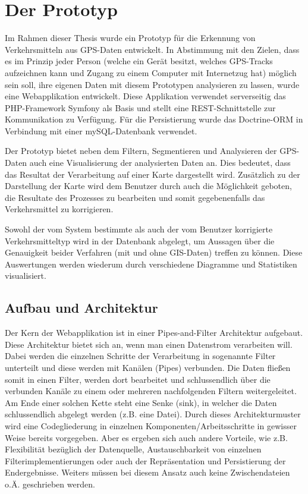 \chapter{Der Prototyp}

Im Rahmen dieser Thesis  wurde ein Prototyp für die Erkennung von Verkehrsmitteln aus GPS-Daten entwickelt. In Abstimmung mit den Zielen, dass es im Prinzip jeder Person (welche ein Gerät besitzt, welches GPS-Tracks aufzeichnen kann und Zugang zu einem Computer mit Internetzug hat) möglich sein soll, ihre eigenen Daten mit diesem Prototypen analysieren zu lassen, wurde eine Webapplikation entwickelt. Diese Applikation verwendet serverseitig das PHP-Framework Symfony als Basis und stellt eine REST-Schnittstelle zur Kommunikation zu Verfügung. Für die Persistierung wurde das Doctrine-ORM in Verbindung mit einer mySQL-Datenbank verwendet.

Der Prototyp bietet neben dem Filtern, Segmentieren und Analysieren der GPS-Daten auch eine Visualisierung der analysierten Daten an. Dies bedeutet, dass das Resultat der Verarbeitung auf einer Karte dargestellt wird. Zusätzlich zu der Darstellung der Karte wird dem Benutzer durch auch die Möglichkeit geboten, die Resultate des Prozesses zu bearbeiten und somit gegebenenfalls das Verkehrsmittel zu korrigieren. 

Sowohl der vom System bestimmte als auch der vom Benutzer  korrigierte Verkehrsmitteltyp wird in der Datenbank abgelegt, um Aussagen über die Genauigkeit beider Verfahren (mit und ohne GIS-Daten) treffen zu können. Diese Auswertungen werden wiederum durch verschiedene Diagramme und Statistiken visualisiert.
\clearpage

\section{Aufbau und Architektur}
Der Kern der Webapplikation ist in einer Pipes-and-Filter Architektur aufgebaut. Diese Architektur bietet sich an, wenn man einen Datenstrom verarbeiten will. Dabei werden die einzelnen Schritte der Verarbeitung in sogenannte Filter unterteilt und diese werden mit Kanälen (Pipes) verbunden. Die Daten fließen somit in einen Filter, werden dort bearbeitet und schlussendlich über die verbunden Kanäle zu einem oder mehreren nachfolgenden Filtern weitergeleitet. Am Ende einer solchen Kette steht eine Senke (sink), in welcher die Daten schlussendlich abgelegt werden (z.B. eine Datei). Durch dieses Architekturmuster wird eine Codegliederung in einzelnen Komponenten/Arbeitsschritte in gewisser Weise bereits vorgegeben. Aber es ergeben sich auch andere Vorteile, wie z.B. Flexibilität bezüglich der Datenquelle, Austauschbarkeit von einzelnen Filterimplementierungen oder auch der Repräsentation und Persistierung der Endergebnisse. Weiters müssen bei diesem Ansatz auch keine Zwischendateien o.Ä. geschrieben werden. \cite{buschmann_pipes_1998} 

